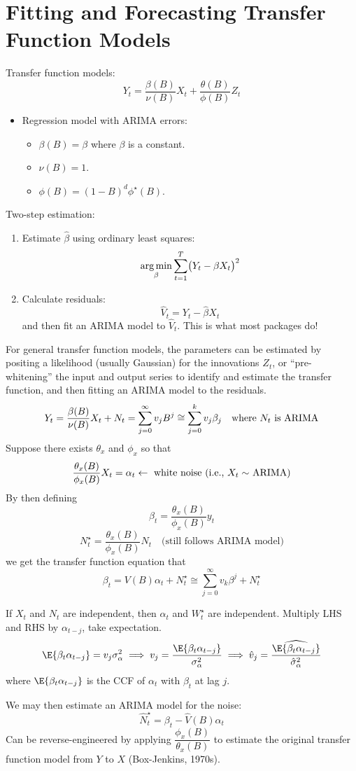 \section{Fitting and Forecasting Transfer Function Models}
Transfer function models:
\[ Y_t=\frac{\beta(B)}{\nu(B)} X_t+\frac{\theta(B)}{\phi(B)} Z_t \]
\begin{itemize}
    \item Regression model with ARIMA errors:
          \begin{itemize}
              \item $ \beta(B)=\beta $ where $ \beta $ is a constant.
              \item $ \nu(B)=1 $.
              \item $ \phi(B)=(1-B)^d \phi^\star(B) $.
          \end{itemize}
\end{itemize}
Two-step estimation:
\begin{enumerate}[(1)]
    \item Estimate $ \hat{\beta} $ using ordinary least squares:
          \[ \operatorname*{arg\,min}_{\beta}\sum_{t=1}^{T} \bigl(Y_t-\beta X_t\bigr)^2 \]
    \item Calculate residuals:
          \[ \hat{V}_t=Y_t-\hat{\beta}X_t \]
          and then fit an ARIMA model to $ \hat{V}_t $. This is what most packages do!
\end{enumerate}
For general transfer function models, the parameters can be estimated by
positing a likelihood (usually Gaussian) for the innovations $ Z_t $, or
``pre-whitening'' the input and output series to identify and estimate the
transfer function, and then fitting an ARIMA model to the residuals.
\[ Y_t=\frac{\beta(B)}{\nu(B)} X_t+N_t=\sum_{j=0}^{\infty} v_j B^j\cong \sum_{j=0}^{k} v_j \beta_j\quad\text{where $ N_t $ is ARIMA} \]
Suppose there exists $ \theta_x $ and $ \phi_x $ so that
\[ \frac{\theta_x(B)}{\phi_x(B)} X_t=\alpha_t\leftarrow\text{ white noise (i.e., $ X_t \sim $ ARIMA)} \]
By then defining
\[ \beta_t=\frac{\theta_x(B)}{\phi_x(B)} y_t \]
\[ N_t^\star = \frac{\theta_x(B)}{\phi_x(B)} N_t\quad\text{(still follows ARIMA model)} \]
we get the transfer function equation that
\[ \beta_t=V(B)\alpha_t+N_t^\star\cong \sum_{j=0}^{\infty} v_k \beta^j+N_t^\star \]
\begin{Remark}{}{}
    If $ X_t $ and $ N_t $ are independent, then $ \alpha_t $ and $ W_t^\star $ are independent.
    Multiply LHS and RHS by $ \alpha_{t-j} $, take expectation.
    \[ \E{\beta_t\alpha_{t-j}}=v_j \sigma_\alpha^2\implies
        v_j=\frac{\E{\beta_t\alpha_{t-j}}}{\sigma_\alpha^2}\implies
        \hat{v}_j=\frac{\widehat{\E{\beta_t\alpha_{t-j}}}}{\hat{\sigma}_\alpha^2}  \]
    where $ \E{\beta_t \alpha_{t-j}} $ is the CCF of $ \alpha_t $ with $ \beta_t $ at
    lag $ j $.
\end{Remark}
We may then estimate an ARIMA model for the noise:
\[ \hat{N}_t^\star=\beta_t-\hat{V}(B)\alpha_t \]
Can be reverse-engineered by applying $ \dfrac{\phi_x(B)}{\theta_x(B)} $
to estimate the original transfer function model from $ Y $ to $ X $ (Box-Jenkins, 1970s).
